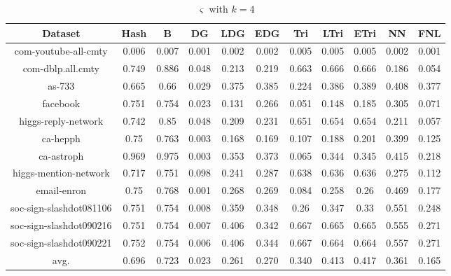 \documentclass{sig-alternate-2013}
\begin{document}
\begin{table}[!hpp]
\centering
\caption{$\varsigma$ with $k=4$}
\begin{tabular}{ccccccccccc}
\hline
Dataset                 &Hash       &B          &DG         &LDG        &EDG        &Tri        &LTri       &ETri      &NN         &FNL\\
\hline
com-youtube-all-cmty	&0.006		&0.007		&0.001		&0.002		&0.002		&0.005		&0.005		&0.005		&0.002		&0.001		\\
com-dblp.all.cmty		&0.749		&0.886		&0.048		&0.213		&0.219		&0.663		&0.666		&0.666		&0.186		&0.054		\\
as-733		            &0.665		&0.66		&0.029		&0.375		&0.385		&0.224		&0.386		&0.389		&0.408		&0.377		\\
facebook		        &0.751		&0.754		&0.023		&0.131		&0.266		&0.051		&0.148		&0.185		&0.305		&0.071		\\
higgs-reply-network		&0.742		&0.85		&0.048		&0.209		&0.231		&0.651		&0.654		&0.654		&0.211		&0.057		\\
ca-hepph		        &0.75		&0.763		&0.003		&0.168		&0.169		&0.107		&0.188		&0.201		&0.399		&0.125		\\
ca-astroph		        &0.969		&0.975		&0.003		&0.353		&0.373		&0.065		&0.344		&0.345		&0.415		&0.218		\\
higgs-mention-network	&0.717		&0.751		&0.098		&0.241		&0.287		&0.638		&0.636		&0.636		&0.275		&0.112		\\
email-enron		        &0.75		&0.768		&0.001		&0.268		&0.269		&0.084		&0.258		&0.26		&0.469		&0.177		\\
soc-sign-slashdot081106	&0.751		&0.754		&0.008		&0.359		&0.348		&0.26		&0.347		&0.33		&0.551		&0.248		\\
soc-sign-slashdot090216	&0.751		&0.754		&0.007		&0.406		&0.342		&0.667		&0.665		&0.665		&0.555		&0.271		\\
soc-sign-slashdot090221	&0.752		&0.754		&0.006		&0.406		&0.344		&0.667		&0.664		&0.664		&0.557		&0.271		\\
\hline
avg.                    &0.696      &0.723      &0.023	    &0.261   	&0.270	    &0.340	    &0.413	    &0.417	    &0.361	    &0.165	    \\
\hline
\end{tabular}
\end{table}
\end{document}

